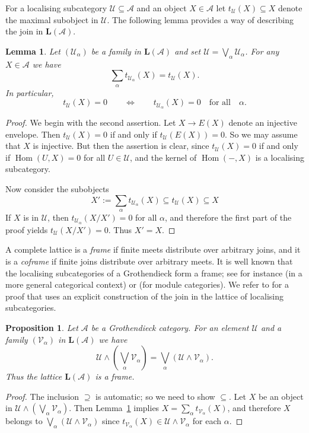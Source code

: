 \documentclass[a4paper]{amsart}
\theoremstyle{plain}
\newtheorem{prop}[thm]{Proposition}
\newtheorem{lem}[thm]{Lemma}
\theoremstyle{definition}
\theoremstyle{remark}
\numberwithin{equation}{section}
\newcommand{\Hom}{\operatorname{Hom}}
\def\A{\mathcal A}
\def\U{\mathcal U}
\def\V{\mathcal V}
\def\bfL{\mathbf L}
\def\a{\alpha}
\begin{document}
For a localising subcategory $\U\subseteq\A$ and an object $X\in\A$ let
$t_\U(X)\subseteq X$ denote the maximal subobject in $\U$.  The
following lemma provides a way of describing the join in $\bfL(\A)$.

\begin{lem}\label{le:join}
Let $(\U_\a)$ be a family in
$\bfL(\A)$ and set $\U=\bigvee_\a\U_\a$. For any $X\in\A$ we have
\[\sum_\a t_{\U_\a}(X)=t_\U(X).\]
In particular,
\[t_\U(X)=0\qquad\iff\qquad t_{\U_\a}(X)=0\quad \text{for
    all}\quad\a.\]
\end{lem}
\begin{proof}
  We begin with the second assertion.  Let $X\to E(X)$ denote an injective
  envelope. Then $t_\U(X)=0$ if and only if $t_\U(E(X))=0$. So
  we may assume that $X$ is injective. But then the assertion is
  clear, since $t_\U(X)=0$ if and only if $\Hom(U,X)=0$ for all
  $U\in\U$, and the kernel of $\Hom(-,X)$ is a localising subcategory.

  Now consider the subobjects
  \[X':=\sum_\a t_{\U_\a}(X) \subseteq t_\U(X) \subseteq X\] If $X$ is
  in $\U$, then $t_{\U_\a}(X/X')=0$ for all $\a$, and therefore
the first part of the proof yields  $t_\U(X/X')=0$. Thus $X'=X$.
\end{proof}

A complete lattice is a \emph{frame} if finite meets distribute over
arbitrary joins, and it is a \emph{coframe} if finite joins distribute
over arbitrary meets. It is well known that the localising
subcategories of a Grothendieck form a frame; see for
instance \cite{BK1987} (in a more general categorical context) or
\cite{Go1986} (for module categories). We refer to \cite{St2024} for a
proof that uses an explicit construction of the join in the lattice of
localising subcategories.

\begin{prop}\label{pr:lattice-loc}
  Let $\A$ be a Grothendieck category. For an element $\U$ and a family $(\V_\a)$ in
  $\bfL(\A)$ we have
  \[\U\wedge\left(\bigvee_\a\V_\a\right)=\bigvee_\a(\U\wedge\V_\a).\]
  Thus the lattice $\bfL(\A)$ is a frame.
\end{prop}
\begin{proof}
  The inclusion $\supseteq$ is automatic; so we need to show
  $\subseteq$. Let $X$ be an object in
  $\U\wedge\left(\bigvee_\a\V_\a\right)$. Then Lemma~\ref{le:join}
  implies $X=\sum_\a t_{\V_\a}(X)$, and therefore 
$X$ belongs to  $\bigvee_\a(\U\wedge\V_\a)$ since $
t_{\V_\a}(X)\in \U\wedge\V_\a$ for each $\a$.
\end{proof}
\end{document}
